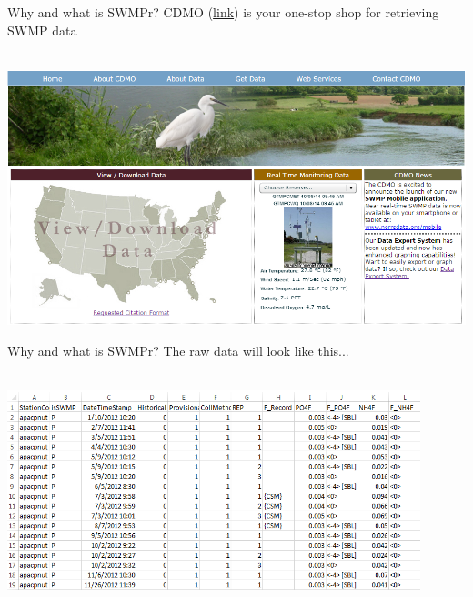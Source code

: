 \documentclass[xcolor=dvipsnames]{beamer}\usepackage[]{graphicx}\usepackage[]{color}
\begin{document}
\begin{frame}[t]{Why and what is SWMPr?}
CDMO (\href{http://cdmo.baruch.sc.edu/}{link}) is your one-stop shop for retrieving SWMP data \\~\\
\centerline{\includegraphics[width = \textwidth]{imgs/cdmo_front.png}}
\end{frame}

\begin{frame}{Why and what is SWMPr?}
The raw data will look like this...\\~\\
\centerline{\includegraphics[width = 0.9\textwidth]{imgs/qaqc_ex.png}}
\end{frame}

\end{document}
